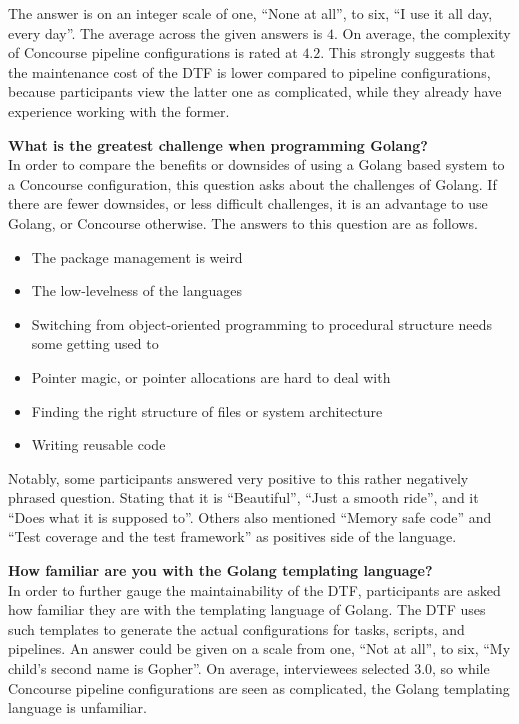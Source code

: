 The answer is on an integer scale of one, ``None at all'', to six, ``I use it all day, every day''.
The average across the given answers is $4$.
On average, the complexity of Concourse pipeline configurations is rated at $4.2$.
This strongly suggests that the maintenance cost of the DTF is lower compared to pipeline configurations, because participants view the latter one as complicated, while they already have experience working with the former.

\textbf{What is the greatest challenge when programming Golang?}\\
In order to compare the benefits or downsides of using a Golang based system to a Concourse configuration, this question asks about the challenges of Golang.
If there are fewer downsides, or less difficult challenges, it is an advantage to use Golang, or Concourse otherwise.
The answers to this question are as follows.

\begin{itemize}
    \item The package management is weird
    \item The low-levelness of the languages
    \item Switching from object-oriented programming to procedural structure needs some getting used to
    \item Pointer magic, or pointer allocations are hard to deal with
    \item Finding the right structure of files or system architecture
    \item Writing reusable code
\end{itemize}

Notably, some participants answered very positive to this rather negatively phrased question.
Stating that it is ``Beautiful'', ``Just a smooth ride'', and it ``Does what it is supposed to''.
Others also mentioned ``Memory safe code'' and ``Test coverage and the test framework'' as positives side of the language.

\textbf{How familiar are you with the Golang templating language?}\\
In order to further gauge the maintainability of the DTF, participants are asked how familiar they are with the templating language of Golang.
The DTF uses such templates to generate the actual configurations for tasks, scripts, and pipelines.
An answer could be given on a scale from one, ``Not at all'', to six, ``My child's second name is Gopher''.
On average, interviewees selected $3.0$, so while Concourse pipeline configurations are seen as complicated, the Golang templating language is unfamiliar.

